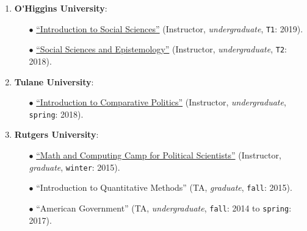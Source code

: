 \begin{enumerate}

\item {\bf O\'\unskip Higgins University}:
  
    \begin{itemize}
      \item[$\bullet$] \href{https://github.com/hbahamonde/Intro_Ciencias_Sociales/raw/master/Bahamonde_Intro_Ciencias_Sociales.pdf}{``Introduction to Social Sciences''} (Instructor, \emph{undergraduate}, \texttt{T1}: 2019).
      \item[$\bullet$] \href{https://github.com/hbahamonde/Social_Sciences_Epistemology_UGRAD/raw/master/Bahamonde_Social_Sciences_Epistemology_UGRAD_Syllabus.pdf}{``Social Sciences and Epistemology''} (Instructor, \emph{undergraduate}, \texttt{T2}: 2018).
    \end{itemize}

\item {\bf Tulane University}:
  
    \begin{itemize}
      \item[$\bullet$] \href{https://github.com/hbahamonde/Comparative_Politics_UGRAD/raw/master/Bahamonde_Comparative_Politics_Syllabus_UGRAD.pdf}{``Introduction to Comparative Politics''} (Instructor, \emph{undergraduate}, \texttt{spring}: 2018).
    \end{itemize}

\item {\bf Rutgers University}:

    \begin{itemize}
      \item[$\bullet$] \href{http://github.com/hbahamonde/Math-Camp/raw/master/Syllabus/Math_Camp_Syllabus.pdf/}{``Math and Computing Camp for Political Scientists''} (Instructor, \emph{graduate}, \texttt{winter}: 2015).
      
      \item[$\bullet$] ``Introduction to Quantitative Methods'' (TA, \emph{graduate}, \texttt{fall}: 2015).
      
      \item[$\bullet$] ``American Government'' (TA, \emph{undergraduate}, \texttt{fall}: 2014 to \texttt{spring}: 2017).
    \end{itemize}

\end{enumerate}